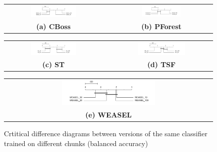 \begin{figure} [!htb]
    \centering
    \begin{tabular}{ccc}
    \includegraphics[width=0.49\textwidth]{./Chapters/06 Results/cd_accuracy_within_cboss.png} & & 
    \includegraphics[width=0.40\textwidth]{./Chapters/06 Results/cd_accuracy_within_pforest.png} \\
    \textbf{(a) CBoss} & & \textbf{(b) PForest} \\[6pt]
    \end{tabular}
    \begin{tabular}{ccc}
    \includegraphics[width=0.49\textwidth]{./Chapters/06 Results/cd_accuracy_within_st.png} & & 
    \includegraphics[width=0.49\textwidth]{./Chapters/06 Results/cd_accuracy_within_tsf.png} \\
    \textbf{(c) ST} & & \textbf{(d) TSF}  \\[6pt]
    \end{tabular}
    \begin{tabular}{ccc}
    & \includegraphics[width=0.49\textwidth]{./Chapters/06 Results/cd_f_score_within_weasel.png} & \\
    & \textbf{(e) WEASEL} & \\[6pt]
    \end{tabular}
    \caption{Crtitical difference diagrams between versions of the same classifier trained on different chunks (balanced accuracy)}
  \end{figure}


